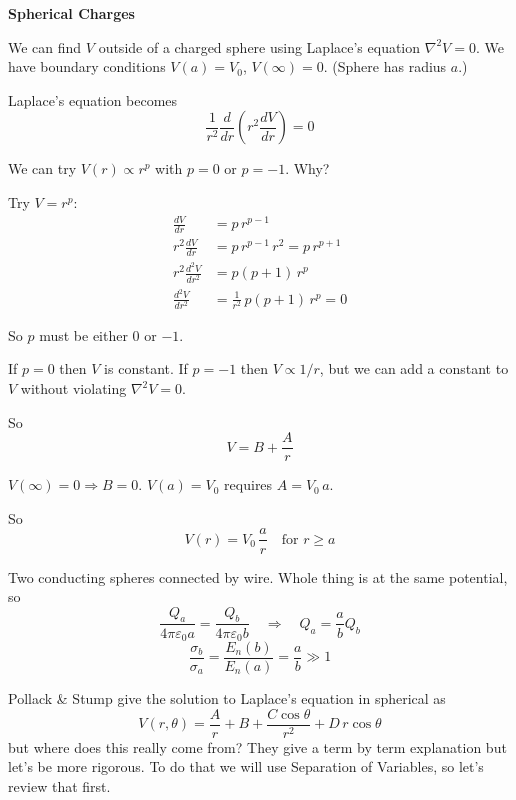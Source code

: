 \documentclass[11pt]{article}
\begin{document}
\textbf{Spherical Charges}

We can find $V$ outside of a charged sphere using Laplace's equation $\nabla^2 V = 0$. We have boundary conditions $V(a) = V_0$, $V(\infty) = 0$. (Sphere has radius $a$.)

Laplace's equation becomes
\[
\frac{1}{r^2}\frac{d}{dr}\left(r^2\frac{dV}{dr}\right) = 0
\]

We can try $V(r) \propto r^p$ with $p = 0$ or $p = -1$. Why?

Try $V = r^p$:
\begin{align*}
\frac{dV}{dr} &= p\,r^{p-1} \\
r^2\frac{dV}{dr} &= p\,r^{p-1}\,r^2 = p\,r^{p+1} \\
r^2\frac{d^2V}{dr^2} &= p(p+1)\,r^p \\
\frac{d^2V}{dr^2} &= \frac{1}{r^2}\,p(p+1)\,r^p = 0
\end{align*}

So $p$ must be either $0$ or $-1$.

If $p = 0$ then $V$ is constant. If $p = -1$ then $V \propto 1/r$, but we can add a constant to $V$ without violating $\nabla^2 V = 0$.

So
\[
V = B + \frac{A}{r}
\]

$V(\infty) = 0 \Rightarrow B = 0$. $V(a) = V_0$ requires $A = V_0\,a$.

So
\[
V(r) = V_0\,\frac{a}{r} \quad \text{for } r \geq a
\]
\newpage
\usetikzlibrary{calc}
\begin{center}
\end{center}
\noindent Two conducting spheres connected by wire. Whole thing is at the same potential, so
\[
\frac{Q_a}{4\pi\varepsilon_0 a} = \frac{Q_b}{4\pi\varepsilon_0 b}
\quad\Rightarrow\quad
Q_a = \frac{a}{b}Q_b
\]
\[
\frac{\sigma_b}{\sigma_a} = \frac{E_n(b)}{E_n(a)} = \frac{a}{b} \gg 1
\]
\begingroup\sloppy

\noindent Pollack \& Stump give the solution to Laplace's equation in spherical as
\[
V(r,\theta) = \frac{A}{r} + B + \frac{C\cos\theta}{r^{2}} + D\,r\cos\theta
\]
but where does this really come from? They give a term by term explanation but let's be more rigorous. To do that we will use Separation of Variables, so let's review that first.
\end{document}
